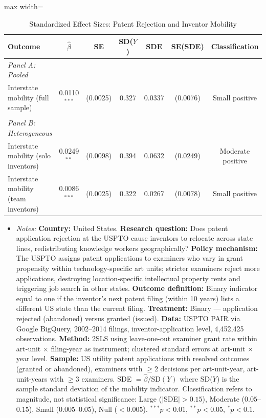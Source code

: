 \begin{table}[t]
\centering
\caption{Standardized Effect Sizes: Patent Rejection and Inventor Mobility}
\label{tab:sde}
\begin{adjustbox}{max width=\textwidth}
\begin{tabular}{lcccccc}
\hline\hline
Outcome & $\hat{\beta}$ & SE & SD($Y$) & SDE & SE(SDE) & Classification \\
\hline
\textit{Panel A: Pooled} & & & & & & \\
\quad Interstate mobility (full sample) & 0.0110$^{***}$ & (0.0025) & 0.327 & 0.0337 & (0.0076) & Small positive \\
 & & & & & & \\
\textit{Panel B: Heterogeneous} & & & & & & \\
\quad Interstate mobility (solo inventors) & 0.0249$^{**}$ & (0.0098) & 0.394 & 0.0632 & (0.0249) & Moderate positive \\
\quad Interstate mobility (team inventors) & 0.0086$^{***}$ & (0.0025) & 0.322 & 0.0267 & (0.0078) & Small positive \\
\hline\hline
\end{tabular}
\end{adjustbox}
\begin{itemize}[leftmargin=*,noitemsep,topsep=2pt] \item \textit{Notes:} \textbf{Country:} United States. \textbf{Research question:} Does patent application rejection at the USPTO cause inventors to relocate across state lines, redistributing knowledge workers geographically? \textbf{Policy mechanism:} The USPTO assigns patent applications to examiners who vary in grant propensity within technology-specific art units; stricter examiners reject more applications, destroying location-specific intellectual property rents and triggering job search in other states. \textbf{Outcome definition:} Binary indicator equal to one if the inventor's next patent filing (within 10 years) lists a different US state than the current filing. \textbf{Treatment:} Binary --- application rejected (abandoned) versus granted (issued). \textbf{Data:} USPTO PAIR via Google BigQuery, 2002--2014 filings, inventor-application level, 4,452,425 observations. \textbf{Method:} 2SLS using leave-one-out examiner grant rate within art-unit $\times$ filing-year as instrument; clustered standard errors at art-unit $\times$ year level. \textbf{Sample:} US utility patent applications with resolved outcomes (granted or abandoned), examiners with $\geq$2 decisions per art-unit-year, art-unit-years with $\geq$3 examiners. SDE $= \hat{\beta} / \text{SD}(Y)$ where SD($Y$) is the sample standard deviation of the mobility indicator. Classification refers to magnitude, not statistical significance: Large ($|$SDE$| > 0.15$), Moderate ($0.05$--$0.15$), Small ($0.005$--$0.05$), Null ($< 0.005$). $^{***}p<0.01$, $^{**}p<0.05$, $^{*}p<0.1$. \end{itemize}
\end{table}
